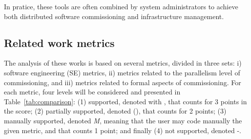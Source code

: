 In pratice, these tools are often combined by system administrators to achieve both distributed software commissioning and infrastructure management. 

\subsection{Related work metrics}

The analysis of these works is based on several metrics, divided in three sets: i) software engineering (SE) metrics, ii) metrics related to the parallelism level of commissioning, and iii) metrics related to formal aspects of commissioning. For each metric, four levels will be considered and presented in Table~\ref{tab:comparison}: (1) supported, denoted with \checkmark, that counts for 3 points in the score; (2) partially supported, denoted (\checkmark), that counts for 2 points; (3) manually supported, denoted \emph{M}, meaning that the user may code manually the given metric, and that counts 1 point; and finally
(4) not supported, denoted -.

